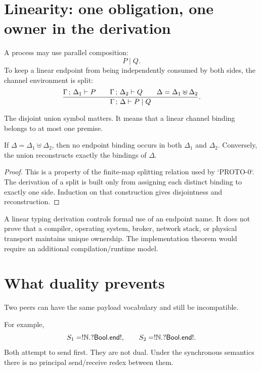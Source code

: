 \section{Linearity: one obligation, one owner in the derivation}

A process may use parallel composition:
\[
   P\mid Q.
\]
To keep a linear endpoint from being independently consumed by both sides, the channel
environment is split:
\[
\frac{
  \Gamma\,;\,\Delta_1 \vdash P
  \qquad
  \Gamma\,;\,\Delta_2 \vdash Q
  \qquad
  \Delta=\Delta_1\uplus\Delta_2
}{
  \Gamma\,;\,\Delta \vdash P\mid Q
}.
\]

The disjoint union symbol matters. It means that a linear channel binding belongs to at most one
premise.



\begin{proposition}
If \(\Delta=\Delta_1\uplus\Delta_2\), then no endpoint binding occurs in both
\(\Delta_1\) and \(\Delta_2\). Conversely, the union reconstructs exactly the bindings of
\(\Delta\).
\end{proposition}

\begin{proof}
This is a property of the finite-map splitting relation used by `PROTO-0`. The derivation of a
split is built only from assigning each distinct binding to exactly one side. Induction on that
construction gives disjointness and reconstruction.
\end{proof}

\begin{warningbox}
A linear typing derivation controls formal use of an endpoint name. It does not prove that a
compiler, operating system, broker, network stack, or physical transport maintains unique
ownership. The implementation theorem would require an additional compilation/runtime model.
\end{warningbox}

\section{What duality prevents}

Two peers can have the same payload vocabulary and still be incompatible.

For example,
\[
S_1=!\mathbb{N}.?\mathsf{Bool}.\mathsf{end!},
\qquad
S_2=!\mathbb{N}.?\mathsf{Bool}.\mathsf{end!}.
\]
Both attempt to send first. They are not dual. Under the synchronous semantics there is no
principal send/receive redex between them.

